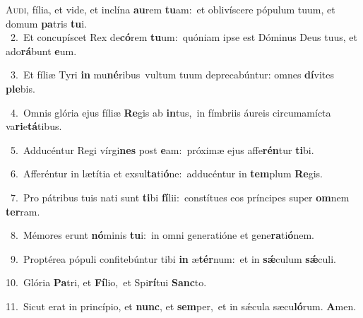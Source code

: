 \lettrine{\initial\textcolor{\initialcolor}{A}}{udi,} fília, et vide, et inclína \textbf{au}\-rem \textbf{tu}\-am:~\star et oblivíscere pópulum tuum, et domum \textbf{pa}\-tris \textbf{tu}\-i.\\
{\numbfont\textcolor{\numbcolor}{~2.}}~Et concupíscet Rex de\-\textbf{có}\-rem \textbf{tu}\-um:~\star quóniam ipse est Dóminus Deus tuus, et ado\-\textbf{rá}\-bunt \textbf{e}\-um.\par
{\numbfont\textcolor{\numbcolor}{~3.}}~Et fíliæ Tyri \textbf{in} mu\-\textbf{né}\-ribus~\star vultum tuum deprecabúntur: omnes \textbf{dí}\-vites \textbf{ple}\-bis.\par
{\numbfont\textcolor{\numbcolor}{~4.}}~Omnis glória ejus fíliæ \textbf{Re}\-gis ab \textbf{in}\-tus,~\star in fímbriis áureis circumamícta va\-\textbf{ri}\-e\-\textbf{tá}\-tibus.\par
{\numbfont\textcolor{\numbcolor}{~5.}}~Adducéntur Regi vírgi\textbf{nes} post \textbf{e}\-am:~\star próximæ ejus affe\-\textbf{rén}\-tur \textbf{ti}\-bi.\par
{\numbfont\textcolor{\numbcolor}{~6.}}~Afferéntur in lætítia et exsul\-\textbf{ta}\-ti\-\textbf{ó}\-ne:~\star adducéntur in \textbf{tem}\-plum \textbf{Re}\-gis.\par
{\numbfont\textcolor{\numbcolor}{~7.}}~Pro pátribus tuis nati sunt \textbf{ti}\-bi \textbf{fí}\-lii:~\star constítues eos príncipes super \textbf{om}\-nem \textbf{ter}\-ram.\par
{\numbfont\textcolor{\numbcolor}{~8.}}~Mémores erunt \textbf{nó}\-minis \textbf{tu}\-i:~\star in omni generatióne et gene\-\textbf{ra}\-ti\-\textbf{ó}\-nem.\par
{\numbfont\textcolor{\numbcolor}{~9.}}~Proptérea pópuli confitebúntur tibi \textbf{in} æ\-\textbf{tér}\-num:~\star et in \textbf{sǽ}\-culum \textbf{sǽ}\-culi.\par
{\numbfont\textcolor{\numbcolor}{10.}}~Glória \textbf{Pa}\-tri, et \textbf{Fí}\-lio,~\star et Spi\-\textbf{rí}\-tui \textbf{Sanc}\-to.\par
{\numbfont\textcolor{\numbcolor}{11.}}~Sicut erat in princípio, et \textbf{nunc}\-, et \textbf{sem}\-per,~\star et in sǽcula sæcu\-\textbf{ló}\-rum. \textbf{A}\-men.\par
